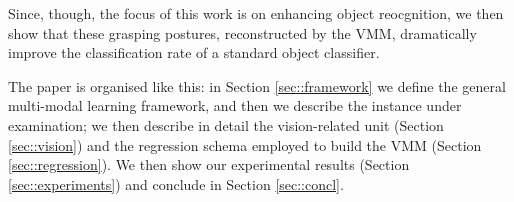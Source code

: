 Since, though, the focus of this work is on enhancing object reocgnition, we then show
that these grasping postures, reconstructed by the VMM, dramatically improve the
classification rate of a standard object classifier.

The paper is organised like this: in Section \ref{sec::framework} we define the general
multi-modal learning framework, and then we describe the instance under examination;
we then describe in detail the vision-related unit (Section \ref{sec::vision}) and the
regression schema employed to build the VMM (Section \ref{sec::regression}). We then show our
experimental results (Section \ref{sec::experiments}) and conclude in Section \ref{sec::concl}.

%
%
%
%
%
%
%
